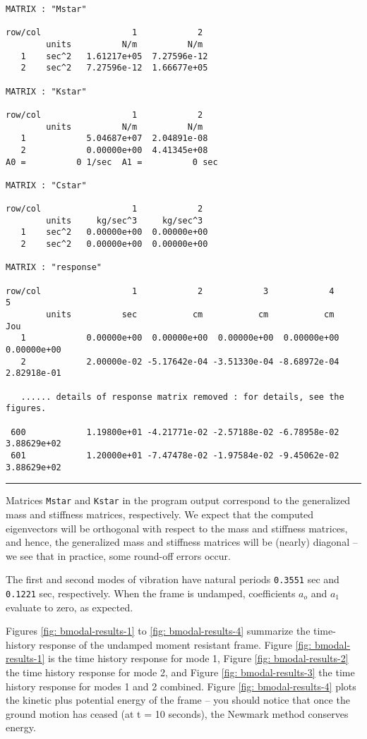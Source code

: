 \begin{footnotesize}
\begin{verbatim}
MATRIX : "Mstar"

row/col                  1            2   
        units          N/m          N/m   
   1    sec^2   1.61217e+05  7.27596e-12
   2    sec^2   7.27596e-12  1.66677e+05

MATRIX : "Kstar"

row/col                  1            2   
        units          N/m          N/m   
   1            5.04687e+07  2.04891e-08
   2            0.00000e+00  4.41345e+08
A0 =          0 1/sec  A1 =          0 sec 

MATRIX : "Cstar"

row/col                  1            2   
        units     kg/sec^3     kg/sec^3   
   1    sec^2   0.00000e+00  0.00000e+00
   2    sec^2   0.00000e+00  0.00000e+00

MATRIX : "response"

row/col                  1            2            3            4            5   
        units          sec           cm           cm           cm          Jou   
   1            0.00000e+00  0.00000e+00  0.00000e+00  0.00000e+00  0.00000e+00
   2            2.00000e-02 -5.17642e-04 -3.51330e-04 -8.68972e-04  2.82918e-01

   ...... details of response matrix removed : for details, see the figures.

 600            1.19800e+01 -4.21771e-02 -2.57188e-02 -6.78958e-02  3.88629e+02
 601            1.20000e+01 -7.47478e-02 -1.97584e-02 -9.45062e-02  3.88629e+02
\end{verbatim}
\rule{6.25 in}{0.035 in}
\end{footnotesize}

\vspace{0.25 in}\noindent
Matrices {\tt Mstar} and {\tt Kstar} in the program output correspond
to the generalized mass and stiffness matrices, respectively.
We expect that the computed eigenvectors will be orthogonal with
respect to the mass and stiffness matrices, and hence,
the generalized mass and stiffness matrices will be (nearly) diagonal --
we see that in practice, some round-off errors occur.

\vspace{0.15 in}
\noindent\hspace{0.50 in}
The first and second modes of vibration have natural periods
{\tt 0.3551} sec and {\tt 0.1221} sec, respectively.
When the frame is undamped,
coefficients $a_o$ and $a_1$ evaluate to zero, as expected.

\vspace{0.15 in}
\noindent\hspace{0.50 in}
Figures \ref{fig: bmodal-results-1} to \ref{fig: bmodal-results-4}
summarize the time-history response of the undamped moment resistant frame.
Figure \ref{fig: bmodal-results-1} is the time history response for mode 1,
Figure \ref{fig: bmodal-results-2} the time history response for mode 2,
and Figure \ref{fig: bmodal-results-3} the time history response for
modes 1 and 2 combined. Figure \ref{fig: bmodal-results-4} plots the kinetic
plus potential energy of the frame -- you should notice that once
the ground motion has ceased (at t = 10 seconds),
the Newmark method conserves energy.

